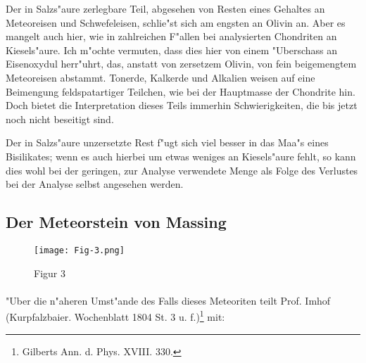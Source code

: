 \documentclass[a4paper, 11pt, oneside]{article}
\begin{document}
Der in Salzs"aure zerlegbare Teil, abgesehen von Resten eines Gehaltes an Meteoreisen und Schwefeleisen, schlie"st sich am engsten an Olivin an. Aber es mangelt auch hier, wie in zahlreichen F"allen bei analysierten Chondriten an Kiesels"aure. Ich m"ochte vermuten, dass dies hier von einem "Uberschass an Eisenoxydul herr"uhrt, das, anstatt von zersetzem Olivin, von fein beigemengtem Meteoreisen abstammt. Tonerde, Kalkerde und Alkalien weisen auf eine Beimengung feldspatartiger Teilchen, wie bei der Hauptmasse der Chondrite hin. Doch bietet die Interpretation dieses Teils immerhin Schwierigkeiten, die bis jetzt noch nicht beseitigt sind.

Der in Salzs"aure unzersetzte Rest f"ugt sich viel besser in das Maa"s eines Bisilikates; wenn es auch hierbei um etwas weniges an Kiesels"aure fehlt, so kann dies wohl bei der geringen, zur Analyse verwendete Menge als Folge des Verlustes bei der Analyse selbst angesehen werden.
\clearpage
\subsection{Der Meteorstein von Massing}
\begin{figure}[h]
\centering
\texttt{[image: Fig-3.png]}
\caption{Figur 3}
\end{figure}
\paragraph{}
"Uber die n"aheren Umst"ande des Falls dieses Meteoriten teilt Prof. Imhof (Kurpfalzbaier. Wochenblatt 1804 St. 3 u. f.)\footnote{Gilberts Ann. d. Phys. XVIII. 330.} mit:
\end{document}
